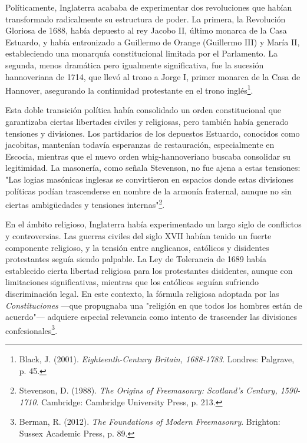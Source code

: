 \documentclass[a4paper,12pt,twoside]{book}
\begin{document}
Políticamente, Inglaterra acababa de experimentar dos revoluciones que habían transformado radicalmente su estructura de poder. La primera, la Revolución Gloriosa de 1688, había depuesto al rey Jacobo II, último monarca de la Casa Estuardo, y había entronizado a Guillermo de Orange (Guillermo III) y María II, estableciendo una monarquía constitucional limitada por el Parlamento. La segunda, menos dramática pero igualmente significativa, fue la sucesión hannoveriana de 1714, que llevó al trono a Jorge I, primer monarca de la Casa de Hannover, asegurando la continuidad protestante en el trono inglés\footnote{Black, J. (2001). \textit{Eighteenth-Century Britain, 1688-1783}. Londres: Palgrave, p. 45.}.

Esta doble transición política había consolidado un orden constitucional que garantizaba ciertas libertades civiles y religiosas, pero también había generado tensiones y divisiones. Los partidarios de los depuestos Estuardo, conocidos como jacobitas, mantenían todavía esperanzas de restauración, especialmente en Escocia, mientras que el nuevo orden whig-hannoveriano buscaba consolidar su legitimidad. La masonería, como señala Stevenson, no fue ajena a estas tensiones: "Las logias masónicas inglesas se convirtieron en espacios donde estas divisiones políticas podían trascenderse en nombre de la armonía fraternal, aunque no sin ciertas ambigüedades y tensiones internas"\footnote{Stevenson, D. (1988). \textit{The Origins of Freemasonry: Scotland's Century, 1590-1710}. Cambridge: Cambridge University Press, p. 213.}.

En el ámbito religioso, Inglaterra había experimentado un largo siglo de conflictos y controversias. Las guerras civiles del siglo XVII habían tenido un fuerte componente religioso, y la tensión entre anglicanos, católicos y disidentes protestantes seguía siendo palpable. La Ley de Tolerancia de 1689 había establecido cierta libertad religiosa para los protestantes disidentes, aunque con limitaciones significativas, mientras que los católicos seguían sufriendo discriminación legal. En este contexto, la fórmula religiosa adoptada por las \textit{Constituciones} —que propugnaba una "religión en que todos los hombres están de acuerdo"— adquiere especial relevancia como intento de trascender las divisiones confesionales\footnote{Berman, R. (2012). \textit{The Foundations of Modern Freemasonry}. Brighton: Sussex Academic Press, p. 89.}.
\end{document}
